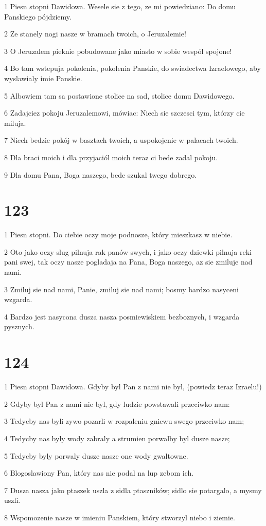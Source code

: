 \par 1 Piesn stopni Dawidowa. Wesele sie z tego, ze mi powiedziano: Do domu Panskiego pójdziemy.
\par 2 Ze stanely nogi nasze w bramach twoich, o Jeruzalemie!
\par 3 O Jeruzalem pieknie pobudowane jako miasto w sobie wespól spojone!
\par 4 Bo tam wstepuja pokolenia, pokolenia Panskie, do swiadectwa Izraelowego, aby wyslawialy imie Panskie.
\par 5 Albowiem tam sa postawione stolice na sad, stolice domu Dawidowego.
\par 6 Zadajciez pokoju Jeruzalemowi, mówiac: Niech sie szczesci tym, którzy cie miluja.
\par 7 Niech bedzie pokój w basztach twoich, a uspokojenie w palacach twoich.
\par 8 Dla braci moich i dla przyjaciól moich teraz ci bede zadal pokoju.
\par 9 Dla domu Pana, Boga naszego, bede szukal twego dobrego.

\chapter{123}

\par 1 Piesn stopni. Do ciebie oczy moje podnosze, który mieszkasz w niebie.
\par 2 Oto jako oczy slug pilnuja rak panów swych, i jako oczy dziewki pilnuja reki pani swej, tak oczy nasze pogladaja na Pana, Boga naszego, az sie zmiluje nad nami.
\par 3 Zmiluj sie nad nami, Panie, zmiluj sie nad nami; bosmy bardzo nasyceni wzgarda.
\par 4 Bardzo jest nasycona dusza nasza posmiewiskiem bezboznych, i wzgarda pysznych.

\chapter{124}

\par 1 Piesn stopni Dawidowa. Gdyby byl Pan z nami nie byl, (powiedz teraz Izraelu!)
\par 2 Gdyby byl Pan z nami nie byl, gdy ludzie powstawali przeciwko nam:
\par 3 Tedycby nas byli zywo pozarli w rozpaleniu gniewu swego przeciwko nam;
\par 4 Tedycby nas byly wody zabraly a strumien porwalby byl dusze nasze;
\par 5 Tedycby byly porwaly dusze nasze one wody gwaltowne.
\par 6 Blogoslawiony Pan, który nas nie podal na lup zebom ich.
\par 7 Dusza nasza jako ptaszek uszla z sidla ptaszników; sidlo sie potargalo, a mysmy uszli.
\par 8 Wspomozenie nasze w imieniu Panskiem, który stworzyl niebo i ziemie.

